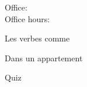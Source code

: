 \documentclass{beamer}
\subtitle[Immeubles et \lexi{choisir}]{Les immeubles et les verbes comme \lexi{choisir}}
\begin{document}
  \begin{frame}
    \titlepage
    \tiny{Office: \\
          Office hours: }
  \end{frame}

  \begin{frame}{Les verbes comme }
    \begin{center}
      
    \end{center}
  \end{frame}

  \begin{frame}{Dans un appartement}
    
  \end{frame}

  \begin{frame}{}
    \begin{center}
      \Large Quiz
    \end{center}
  \end{frame}
\end{document}
